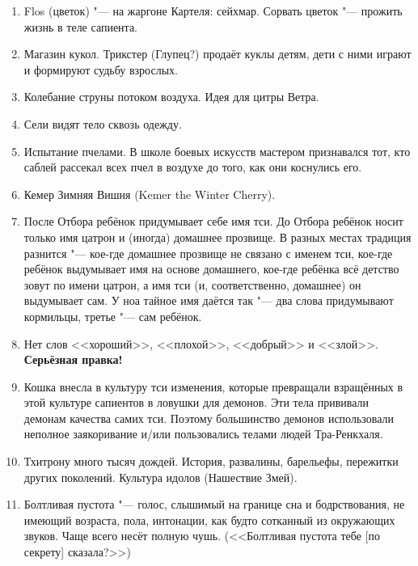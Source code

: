 \begin{enumerate}
\item Flos (цветок) "--- на жаргоне Картеля: сейхмар.
Сорвать цветок "--- прожить жизнь в теле сапиента.

\item Магазин кукол.
Трикстер (Глупец?) продаёт куклы детям, дети с ними играют и формируют судьбу взрослых.

\item Колебание струны потоком воздуха.
Идея для цитры Ветра.

\item Сели видят тело сквозь одежду.

\item Испытание пчелами.
В школе боевых искусств мастером признавался тот, кто саблей рассекал всех пчел в воздухе до того, как они коснулись его.

\item Кемер Зимняя Вишня (Kemer the Winter Cherry).

\item После Отбора ребёнок придумывает себе имя тси.
До Отбора ребёнок носит только имя цатрон и (иногда) домашнее прозвище.
В разных местах традиция разнится "--- кое-где домашнее прозвище не связано с именем тси, кое-где ребёнок выдумывает имя на основе домашнего, кое-где ребёнка всё детство зовут по имени цатрон, а имя тси (и, соответственно, домашнее) он выдумывает сам.
У ноа тайное имя даётся так "--- два слова придумывают кормильцы, третье "--- сам ребёнок.

\item Нет слов <<хороший>>, <<плохой>>, <<добрый>> и <<злой>>.
\textbf{Серьёзная правка!}

\item Кошка внесла в культуру тси изменения, которые превращали взращённых в этой культуре сапиентов в ловушки для демонов.
Эти тела прививали демонам качества самих тси.
Поэтому большинство демонов использовали неполное заякоривание и/или пользовались телами людей Тра-Ренкхаля.

\item Тхитрону много тысяч дождей.
История, развалины, барельефы, пережитки других поколений.
Культура идолов (Нашествие Змей).

\item Болтливая пустота "--- голос, слышимый на границе сна и бодрствования, не имеющий возраста, пола, интонации, как будто сотканный из окружающих звуков.
Чаще всего несёт полную чушь.
(<<Болтливая пустота тебе [по секрету] сказала?>>)


\end{enumerate}
